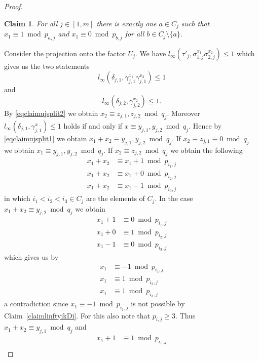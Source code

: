 \documentclass{article}
\newtheorem{claim}{Claim}
\begin{document}
\begin{proof}
\begin{claim}\label{claimlinftyjexactly1a}
For all $j \in [1,m]$ there is exactly one $a \in C_j$ such that $x_1 \equiv 1 \bmod p_{a,j}$ and $x_1 \equiv 0 \bmod p_{b,j}$ for all $b \in C_j \setminus \{a\}$.
\end{claim}
Consider the projection onto the factor $U_j$. We have $l_\infty(\tau'_j, \sigma_{1,j}^{x_1}\sigma_{2,j}^{x_2}) \leq 1$ which gives us the two statements
\begin{equation}\label{eqclaimujsplit1}
l_\infty(\delta_{j,1}, \gamma_{j,1}^{x_1}\gamma_{j,1}^{x_2}) \leq 1
\end{equation}
and
\begin{equation}\label{eqclaimujsplit2}
l_\infty(\delta_{j,2}, \gamma_{j,2}^{x_2}) \leq 1.
\end{equation}
By \eqref{eqclaimujsplit2} we obtain $x_2 \equiv z_{j,1},z_{j,2} \bmod q_j$. Moreover $l_\infty(\delta_{j,1}, \gamma_{j,1}^x) \leq 1$ holds if and only if $x \equiv y_{j,1},y_{j,2} \bmod q_j$. Hence by \eqref{eqclaimujsplit1} we obtain $x_1 + x_2 \equiv y_{j,1},y_{j,2} \bmod q_j$. If $x_2 \equiv z_{j,1} \equiv 0 \bmod q_j$ we obtain $x_1 \equiv y_{j,1},y_{j,2} \bmod q_j$. If $x_2 \equiv z_{j,2} \bmod q_j$ we obtain the following
\begin{align*}
x_1 + x_2 &\equiv x_1 + 1 \bmod p_{i_1,j}\\
x_1 + x_2 &\equiv x_1 + 0 \bmod p_{i_2,j}\\
x_1 + x_2 &\equiv x_1 - 1 \bmod p_{i_3,j}
\end{align*}
in which $i_1 < i_2 < i_3 \in C_j$ are the elements of $C_j$. In the case $x_1+x_2 \equiv y_{j,2} \bmod q_j$ we obtain
\begin{align*}
x_1 + 1 &\equiv 0 \bmod p_{i_1,j}\\
x_1 + 0 &\equiv 1 \bmod p_{i_2,j}\\
x_1 - 1 &\equiv 0 \bmod p_{i_3,j}
\end{align*}
which gives us by
\begin{align*}
x_1 &\equiv -1 \bmod p_{i_1,j}\\
x_1 &\equiv 1 \bmod p_{i_2,j}\\
x_1 &\equiv 1 \bmod p_{i_3,j}
\end{align*}
a contradiction since $x_1 \equiv -1 \bmod p_{i_1,j}$ is not possible by Claim~\ref{claimlinftyikDi}. For this also note that $p_{i,j} \geq 3$. Thus $x_1+x_2 \equiv y_{j,1} \bmod q_j$ and
\begin{align*}
x_1 + 1 &\equiv 1 \bmod p_{i_1,j}\\

\end{align*}
\end{proof}
\end{document}
